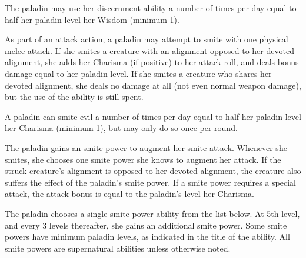 The paladin may use her discernment ability a number of times per day equal to half her paladin level \add her Wisdom (minimum 1).

 As part of an attack action, a paladin may attempt to smite with one physical melee attack. If she smites a creature with an alignment opposed to her devoted alignment, she adds her Charisma (if positive) to her attack roll, and deals bonus damage equal to her paladin level. If she smites a creature who shares her devoted alignment, she deals no damage at all (not even normal weapon damage), but the use of the ability is still spent.

A paladin can smite evil a number of times per day equal to half her paladin level \add her Charisma (minimum 1), but may only do so once per round.

 The paladin gains an smite power to augment her smite attack. Whenever she smites, she chooses one smite power she knows to augment her attack. If the struck creature's alignment is opposed to her devoted alignment, the creature also suffers the effect of the paladin's smite power. If a smite power requires a special attack, the attack bonus is equal to the paladin's level \add her Charisma.

The paladin chooses a single smite power ability from the list below. At 5th level, and every 3 levels thereafter, she gains an additional smite power. Some smite powers have minimum paladin levels, as indicated in the title of the ability. All smite powers are supernatural abilities unless otherwise noted.

